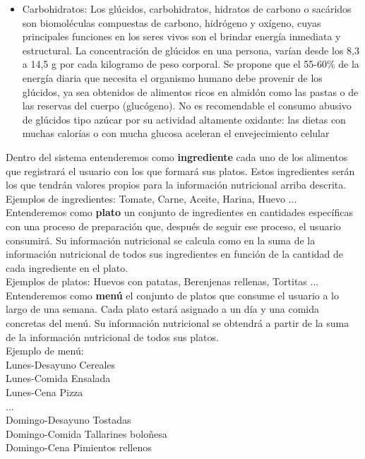 \documentclass[12pt, a4paper, twoside]{book}
\begin{document}
\begin{itemize}
		\item Carbohidratos: Los glúcidos, carbohidratos, hidratos de carbono o sacáridos son biomoléculas compuestas de carbono, hidrógeno y oxígeno, cuyas principales funciones en los seres vivos son el brindar energía inmediata y estructural. La concentración de glúcidos en una persona, varían desde los 8,3 a 14,5 g por cada kilogramo de peso corporal. Se propone que el 55-60\% de la energía diaria que necesita el organismo humano debe provenir de los glúcidos, ya sea obtenidos de alimentos ricos en almidón como las pastas o de las reservas del cuerpo (glucógeno). No es recomendable el consumo abusivo de glúcidos tipo azúcar por su actividad altamente oxidante: las dietas con muchas calorías o con mucha glucosa aceleran el envejecimiento celular
	\end{itemize}
	Dentro del sistema entenderemos como \textbf{ingrediente} cada uno de los alimentos que registrará el usuario con los que formará sus platos. Estos ingredientes serán los que tendrán valores propios para la información nutricional arriba descrita. \\Ejemplos de ingredientes: Tomate, Carne, Aceite, Harina, Huevo ...\\
	Entenderemos como \textbf{plato} un conjunto de ingredientes en cantidades específicas con una proceso de preparación que, después de seguir ese proceso, el usuario consumirá. Su información nutricional se calcula como en la suma de la información nutricional de todos sus ingredientes en función de la cantidad de cada ingrediente en el plato.\\ Ejemplos de platos: Huevos con patatas, Berenjenas rellenas, Tortitas ...\\
	Entenderemos como \textbf{menú} el conjunto de platos que consume el usuario a lo largo de una semana. Cada plato estará asignado a un día y una comida concretas del menú. Su información nutricional se obtendrá a partir de la suma de la información nutricional de todos sus platos.\\ Ejemplo de menú:\\
	Lunes-Desayuno Cereales\\
	Lunes-Comida Ensalada\\
	Lunes-Cena Pizza\\
	...\\
	Domingo-Desayuno Tostadas\\
	Domingo-Comida Tallarines boloñesa\\
	Domingo-Cena Pimientos rellenos
	
\end{document}
